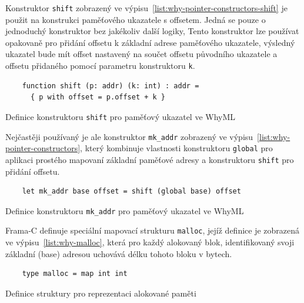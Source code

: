 Konstruktor \texttt{shift} zobrazený ve výpisu~\ref{list:why-pointer-constructors-shift}
je použit na konstrukci paměťového ukazatele s offsetem.
Jedná se pouze o jednoduchý konstruktor bez jakékoliv další logiky,
Tento konstruktor lze používat opakovaně pro přidání offsetu k základní adrese paměťového ukazatele,
výsledný ukazatel bude mít offset nastavený na součet offsetu původního ukazatele
a offsetu přidaného pomocí parametru konstruktoru \texttt{k}.

\begin{listing}[H]
    \begin{verbatim}
    function shift (p: addr) (k: int) : addr =
      { p with offset = p.offset + k }
    \end{verbatim}
    \caption{Definice konstruktoru \texttt{shift} pro paměťový ukazatel ve WhyML}
    \label{list:why-pointer-constructors-shift}
\end{listing}

Nejčastěji používaný je ale konstruktor \texttt{mk\_addr} zobrazený ve výpisu~\ref{list:why-pointer-constructors},
který kombinuje vlastnosti konstruktoru \texttt{global} pro aplikaci prostého mapovaní
základní paměťové adresy a konstruktoru \texttt{shift} pro přidání offsetu.


\begin{listing}[H]
    \begin{verbatim}
    let mk_addr base offset = shift (global base) offset
    \end{verbatim}
    \caption{Definice konstruktoru \texttt{mk\_addr} pro paměťový ukazatel ve WhyML}
    \label{list:why-pointer-constructor-mk-addr}
\end{listing}

Frama\mbox{-}C definuje speciální mapovací strukturu \texttt{malloc},
jejíž definice je zobrazená ve výpisu~\ref{list:why-malloc},
která pro každý alokovaný blok, identifikovaný svoji základní (base) adresou
uchovává délku tohoto bloku v bytech.

\begin{listing}[H]
    \begin{verbatim}
    type malloc = map int int
    \end{verbatim}
    \caption{Definice struktury pro reprezentaci alokované paměti}
    \label{list:why-malloc}
\end{listing}


